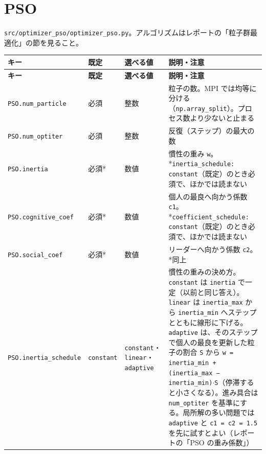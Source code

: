 \section{PSO}

\texttt{src/\allowbreak{}optimizer\_\allowbreak{}pso/\allowbreak{}optimizer\_\allowbreak{}pso.\allowbreak{}py}。アルゴリズムはレポートの「粒子群最適化」の節を見ること。

\begingroup\small
\begin{longtable}{>{\raggedright\arraybackslash}p{}>{\raggedright\arraybackslash}p{}>{\raggedright\arraybackslash}p{}>{\raggedright\arraybackslash}p{}}
\toprule
\textbf{キー} & \textbf{既定} & \textbf{選べる値} & \textbf{説明・注意} \\
\midrule
\endfirsthead
\toprule
\textbf{キー} & \textbf{既定} & \textbf{選べる値} & \textbf{説明・注意} \\
\midrule
\endhead
\bottomrule
\endlastfoot
\texttt{PSO.\allowbreak{}num\_\allowbreak{}particle} & 必須 & 整数 & 粒子の数。MPI では均等に分ける（\texttt{np.\allowbreak{}array\_\allowbreak{}split}）。プロセス数より少ないと止まる \\
\texttt{PSO.\allowbreak{}num\_\allowbreak{}optiter} & 必須 & 整数 & 反復（ステップ）の最大の数 \\
\texttt{PSO.\allowbreak{}inertia} & 必須* & 数値 & 慣性の重み \texttt{w}。*\texttt{inertia\_\allowbreak{}schedule: constant}（既定）のとき必須で、ほかでは読まない \\
\texttt{PSO.\allowbreak{}cognitive\_\allowbreak{}coef} & 必須* & 数値 & 個人の最良へ向かう係数 \texttt{c1}。*\texttt{coefficient\_\allowbreak{}schedule: constant}（既定）のとき必須で、ほかでは読まない \\
\texttt{PSO.\allowbreak{}social\_\allowbreak{}coef} & 必須* & 数値 & リーダーへ向かう係数 \texttt{c2}。*同上 \\
\texttt{PSO.\allowbreak{}inertia\_\allowbreak{}schedule} & \texttt{constant} & \texttt{constant}・\texttt{linear}・\texttt{adaptive} & 慣性の重みの決め方。\texttt{constant} は \texttt{inertia} で一定（以前と同じ答え）。\texttt{linear} は \texttt{inertia\_\allowbreak{}max} から \texttt{inertia\_\allowbreak{}min} へステップとともに線形に下げる。\texttt{adaptive} は、そのステップで個人の最良を更新した粒子の割合 \texttt{S} から \texttt{w = inertia\_\allowbreak{}min + (inertia\_\allowbreak{}max − inertia\_\allowbreak{}min)$\cdot$S}（停滞すると小さくなる）。進み具合は \texttt{num\_\allowbreak{}optiter} を基準にする。局所解の多い問題では \texttt{adaptive} と \texttt{c1 = c2 = 1.\allowbreak{}5} を先に試すとよい（レポートの「PSO の重み係数」） \\

\end{longtable}
